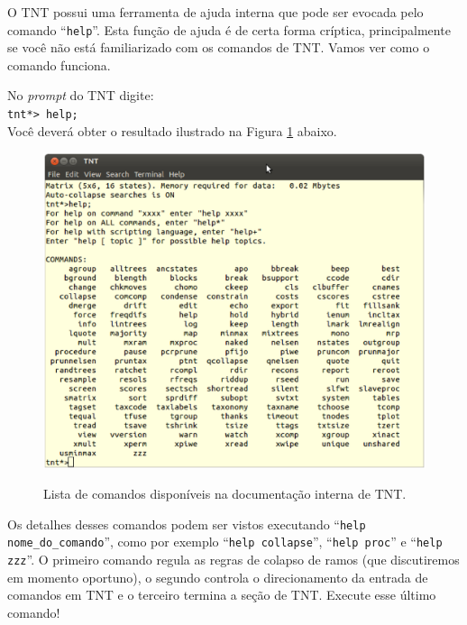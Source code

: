 \begin{refsection}
O TNT possui uma ferramenta de ajuda interna que pode ser evocada pelo comando ``\texttt{help}''. Esta função de ajuda é de certa forma críptica, principalmente se você não está familiarizado com os comandos de TNT. Vamos ver como o comando funciona.

No \textit{prompt} do TNT digite:\\

\indent\indent\texttt{tnt*> help;}\\

Você deverá obter o resultado ilustrado na Figura \ref{tut4:fig:tnt_help} abaixo. 
\\
  \begin{figure}[H]
      {\includegraphics[scale=0.40]{figures/tut4/tnt_help.eps}}
      {\caption[\textit{\textit{Ajuda para comandos de TNT} }]{Lista de comandos disponíveis na documentação interna de TNT.}\label{tut4:fig:tnt_help}}
  \end{figure}


Os detalhes desses comandos podem ser vistos executando ``\texttt{help nome\_do\_comando}'', como por exemplo ``\texttt{help collapse}'', ``\texttt{help proc}'' e ``\texttt{help zzz}''. O primeiro comando regula as regras de colapso de ramos (que discutiremos em momento oportuno), o segundo controla o direcionamento da entrada de comandos em TNT e o terceiro termina a seção de TNT. Execute esse último comando!\\


\end{refsection}
